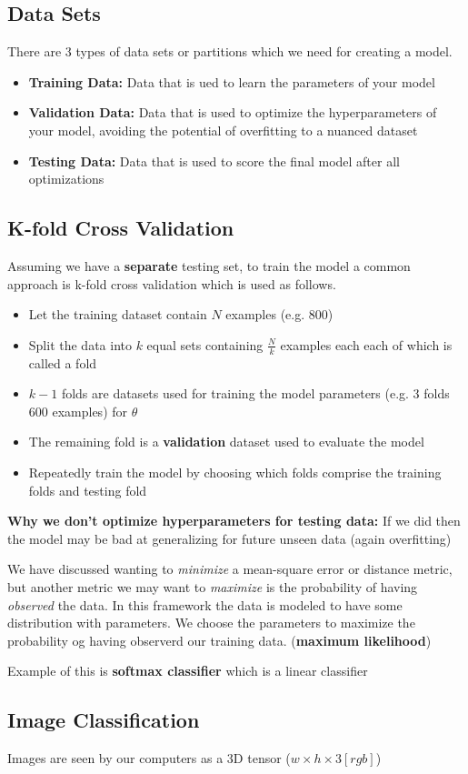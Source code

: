 \documentclass[twocolumn, letter, 10pt, landscape]{article}
\newcommand{\tb}{\textbf}
\newcommand{\ti}{\textit}
\newcommand{\bit}{\vspace{-0.1in}\begin{itemize}\setlength\itemsep{-0.05in}}
\newcommand{\eit}{\end{itemize}\vspace{-0.1in}}
\begin{document}
\subsection{Data Sets}
There are 3 types of data sets or partitions which we need for creating a model.
\bit
\item \tb{Training Data:} Data that is ued to learn the parameters of your model
\item \tb{Validation Data:} Data that is used to optimize the hyperparameters of your model, avoiding the potential of overfitting to a nuanced dataset
\item \tb{Testing Data:} Data that is used to score the final model after all optimizations
\eit

\subsection{K-fold Cross Validation}
Assuming we have a \tb{separate} testing set, to train the model a common approach is k-fold cross validation which is used as follows.
\bit
\item Let the training dataset contain $N$ examples (e.g. 800)
\item Split the data into $k$ equal sets containing $\frac{N}{k}$ examples each each of which is called a fold
\item $k-1$ folds are datasets used for training the model parameters (e.g. 3 folds 600 examples) for $\theta$
\item The remaining fold is a \tb{validation} dataset used to evaluate the model
\item Repeatedly train the model by choosing which folds comprise the training folds and testing fold
\eit

\textbf{Why we don't optimize hyperparameters for testing data:} If we did then the model may be bad at generalizing for future unseen data (again overfitting)

We have discussed wanting to \ti{minimize} a mean-square error or distance metric, but another metric we may want to \ti{maximize} is the probability of having \ti{observed} the data. In this framework the data is modeled to have some distribution with parameters. We choose the parameters to maximize the probability og having observerd our training data. (\tb{maximum likelihood})

Example of this is \tb{softmax classifier} which is a linear classifier

\subsection{Image Classification}
Images are seen by our computers as a 3D tensor ($w\times h \times 3 [rgb]$)
\end{document}
